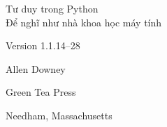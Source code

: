 \documentclass[11pt]{book}
\newcommand{\theversion}{1.1.14--28}
\begin{document}
\frontmatter




\newtheorem{ex}{Exercise}[chapter]


\renewcommand{\blankpage}{\thispagestyle{empty} \quad \newpage}












\pagebreak
\thispagestyle{empty}

\begin{flushright}
\vspace*{2.0in}

\begin{spacing}{3}
{\huge Tư duy trong Python}\\
{\Large Để nghĩ như nhà khoa học máy tính}
\end{spacing}

\vspace{0.25in}

Version \theversion

\vspace{1in}


{\Large
Allen Downey\\
}


\vspace{0.5in}

{\Large Green Tea Press}

{\small Needham, Massachusetts}

\vfill

\end{flushright}
\end{document}
